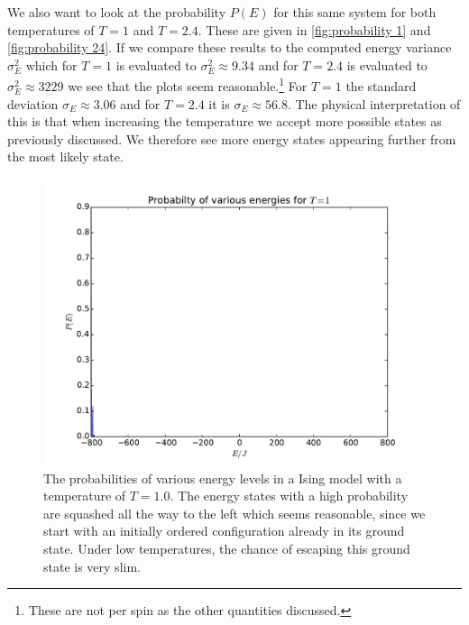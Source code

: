 We also want to look at the probability $P(E)$ for this same system for both
temperatures of $T=1$ and $T = 2.4$. These are given in \cref{fig:probability
1} and \cref{fig:probability 24}. If we compare these results to the computed
energy variance $\sigma_E^2$ which for $T = 1$ is evaluated to $\sigma_E^2
\approx 9.34 $ and for $T = 2.4$ is evaluated to $\sigma_E^2 \approx  3229$ we
see that the plots seem reasonable.\footnote{These are not per spin as the
other quantities discussed.}
For $T = 1$ the standard deviation $\sigma_E \approx 3.06$ and for $T = 2.4$ it
is $\sigma_E \approx 56.8$. The physical interpretation of this is that when
increasing the temperature we accept more possible states as previously
discussed. We therefore see more energy states appearing further from the most
likely state.
\begin{figure}
  \centering
  \includegraphics[width=0.8\linewidth]{probability_1.pdf}
  \caption{The probabilities of various energy levels in a Ising model with a
    temperature of $T = 1.0$. The energy states with a high probability are
    squashed all the way to the left which seems reasonable, since we start
    with an initially ordered configuration already in its ground state. Under
  low temperatures, the chance of escaping this ground state is very slim.}
  \label{fig:probability 1}
\end{figure}

